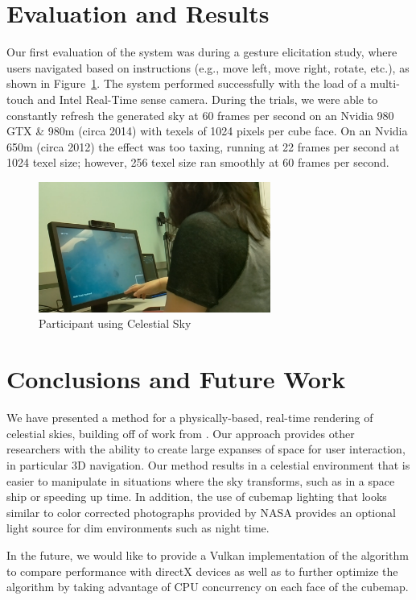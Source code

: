 \documentclass[review]{vgtc}                  %
\begin{document}
\section{Evaluation and Results}

Our first evaluation of the system was during a gesture elicitation study, where users navigated based on instructions (e.g., move left, move right, rotate, etc.), as shown in Figure~\ref{fig:expphoto}. The system performed successfully with the load of a multi-touch and Intel Real-Time sense camera. During the trials, we were able to constantly refresh the generated sky at 60 frames per second on an Nvidia 980 GTX \& 980m (circa 2014) with texels of 1024 pixels per cube face. On an Nvidia 650m (circa 2012) the effect was too taxing, running at 22 frames per second at 1024 texel size; however, 256 texel size ran smoothly at 60 frames per second.

\begin{figure}[bth]
  \centering
  \includegraphics[width=3.0in]{../images/experiment-photo}
  \caption{Participant using Celestial Sky}
  \label{fig:expphoto}
\end{figure}
\section{Conclusions and Future Work}



We have presented a method for a physically-based, real-time rendering of celestial skies, building off of work from \cite{Jensen:2001fr}. Our approach provides other researchers with the ability to create large expanses of space for user interaction, in particular 3D navigation. Our method results in a celestial environment that is easier to manipulate in situations where the sky transforms, such as in a space ship or speeding up time. In addition, the use of cubemap lighting that looks similar to color corrected photographs provided by NASA provides an optional light source for dim environments such as night time.

In the future, we would like to provide a Vulkan implementation of the algorithm to compare performance with directX devices as well as to further optimize the algorithm by taking advantage of CPU concurrency on each face of the cubemap.  
\end{document}
